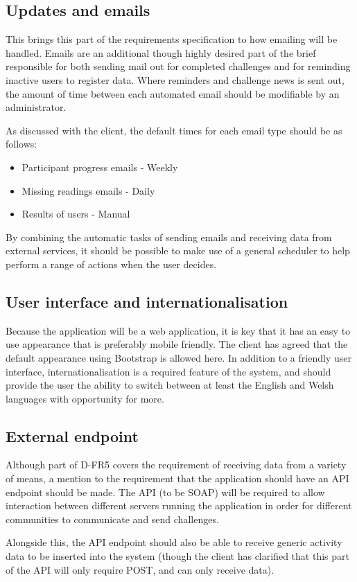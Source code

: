 \subsection{Updates and emails}
This brings this part of the requirements specification to how emailing will be handled. Emails are an additional though highly desired part of the brief responsible for both sending mail out for completed challenges and for reminding inactive users to register data. Where reminders and challenge news is sent out, the amount of time between each automated email should be modifiable by an administrator. \par
As discussed with the client, the default times for each email type should be as follows:
\begin{itemize}
\item Participant progress emails - Weekly
\item Missing readings emails - Daily
\item Results of users - Manual
\end{itemize}
By combining the automatic tasks of sending emails and receiving data from external services, it should be possible to make use of a general scheduler to help perform a range of actions when the user decides.
\subsection{User interface and internationalisation}
Because the application will be a web application, it is key that it has an easy to use appearance that is preferably mobile friendly. The client has agreed that the default appearance using Bootstrap\cite{bootstrap} is allowed here. In addition to a friendly user interface, internationalisation is a required feature of the system, and should provide the user the ability to switch between at least the English and Welsh languages with opportunity for more.
\subsection{External endpoint}
Although part of D-FR5 covers the requirement of receiving data from a variety of means, a mention to the requirement that the application should have an API endpoint should be made. The API (to be SOAP) will be required to allow interaction between different servers running the application in order for different communities to communicate and send challenges. \par
Alongside this, the API endpoint should also be able to receive generic activity data to be inserted into the system (though the client has clarified that this part of the API will only require POST, and can only receive data).
